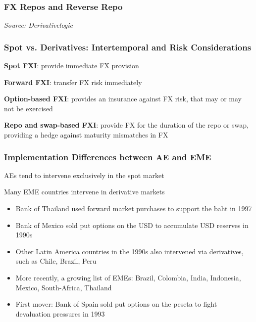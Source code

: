 \documentclass{beamer}
\newenvironment{wideitemize}{\itemize\addtolength{\itemsep}{10pt}}{\enditemize}
\begin{document}
\begin{frame}
\frametitle{FX Repos and Reverse Repo}

\bigskip
\emph{Source: Derivativelogic \href{https://derivativelogic.com/wp-content/uploads/Repo-vs-Reverse-Repo.jpg)}{}}
\end{frame}


\begin{frame}
  \frametitle{Spot vs. Derivatives: Intertemporal and Risk Considerations}
  \begin{wideitemize}
    \item \textbf{Spot FXI}: provide immediate FX provision
    \item \textbf{Forward FXI}: transfer FX risk immediately
    \item \textbf{Option-based FXI}: provides an insurance against FX risk, that may or may not be exercised
    \item \textbf{Repo and swap-based FXI}: provide FX for the duration of the repo or swap, providing a hedge against maturity mismatches in FX
  \end{wideitemize}
\end{frame}


\begin{frame}
  \frametitle{Implementation Differences between AE and EME}
  \begin{wideitemize}
    \item AEs tend to intervene exclusively in the spot market
    \item Many EME countries intervene in derivative markets
      \begin{itemize}
      \item Bank of Thailand used forward market purchases to support the baht in 1997
      \item Bank of Mexico sold put options on the USD to accumulate USD reserves in 1990s
      \item Other Latin America countries in the 1990s also intervened via derivatives, such as Chile, Brazil, Peru
      \item More recently, a growing list of EMEs: Brazil, Colombia, India, Indonesia, Mexico, South-Africa, Thailand
      \item First mover: Bank of Spain sold put options on the peseta to fight devaluation pressures in 1993
      \end{itemize}
  \end{wideitemize}
\end{frame}
\end{document}
